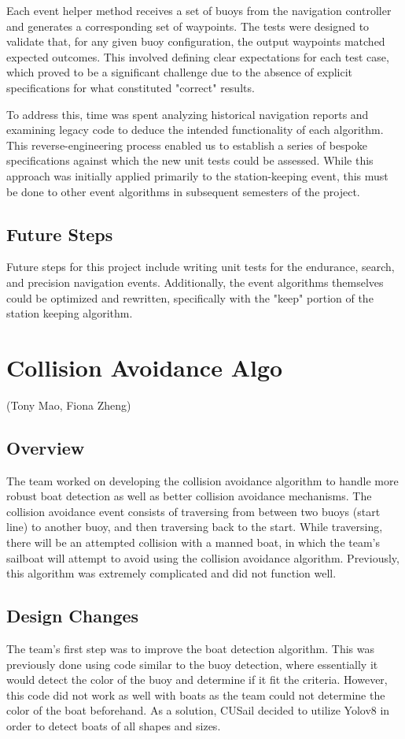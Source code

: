 \documentclass{article}
\begin{document}
Each event helper method receives a set of buoys from the navigation controller and generates a corresponding set of waypoints. The tests were designed to validate that, for any given buoy configuration, the output waypoints matched expected outcomes. This involved defining clear expectations for each test case, which proved to be a significant challenge due to the absence of explicit specifications for what constituted "correct" results.

To address this, time was spent analyzing historical navigation reports and examining legacy code to deduce the intended functionality of each algorithm. This reverse-engineering process enabled us to establish a series of bespoke specifications against which the new unit tests could be assessed. While this approach was initially applied primarily to the station-keeping event, this must be done to other event algorithms in subsequent semesters of the project.

\subsection{Future Steps}
Future steps for this project include writing unit tests for the endurance, search, and precision navigation events. Additionally, the event algorithms themselves could be optimized and rewritten, specifically with the "keep" portion of the station keeping algorithm. 

\section{Collision Avoidance Algo}
(Tony Mao, Fiona Zheng)

\subsection{Overview}
The team worked on developing the collision avoidance algorithm to handle more robust boat detection as well as better collision avoidance mechanisms. The collision avoidance event consists of traversing from between two buoys (start line) to another buoy, and then traversing back to the start. While traversing, there will be an attempted collision with a manned boat, in which the team's sailboat will attempt to avoid using the collision avoidance algorithm. Previously, this algorithm was extremely complicated and did not function well.

\subsection{Design Changes}
The team's first step was to improve the boat detection algorithm. This was previously done using code similar to the buoy detection, where essentially it would detect the color of the buoy and determine if it fit the criteria. However, this code did not work as well with boats as the team could not determine the color of the boat beforehand. As a solution, CUSail decided to utilize Yolov8 in order to detect boats of all shapes and sizes. 
\end{document}
